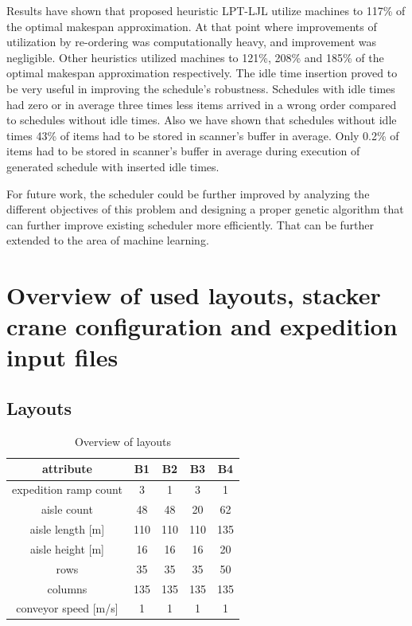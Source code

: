 \documentclass{ctuthesis}
\begin{document}
Results have shown that proposed heuristic LPT-LJL utilize machines to 117\% of the optimal makespan approximation. At that point where improvements of utilization by re-ordering was computationally heavy, and improvement was negligible. Other heuristics utilized machines to 121\%, 208\% and 185\% of the optimal makespan approximation respectively. The idle time insertion proved to be very useful in improving the schedule's robustness. Schedules with idle times had zero or in average three times less items arrived in a wrong order compared to schedules without idle times. Also we have shown that schedules without idle times 43\% of items had to be stored in scanner's buffer in average. Only 0.2\% of items had to be stored in scanner's buffer in average during execution of generated schedule with inserted idle times.

For future work, the scheduler could be further improved by analyzing the different objectives of this problem and designing a proper genetic algorithm that can further improve existing scheduler more efficiently. That can be further extended to the area of machine learning.






\appendix

\chapter{Overview of used layouts, stacker crane configuration and expedition input files}

\section{Layouts}

\begin{table}[H]
\begin{tabular}{ |c|| c | c | c | c |} 
\hline
attribute & B1 & B2 & B3 & B4\\ 
\hline
expedition ramp count & 3 & 1 & 3 & 1 \\
\hline
aisle count & 48 & 48 & 20 & 62\\
\hline
aisle length [m] &  110 & 110 & 110 & 135\\
\hline
aisle height [m] & 16 & 16 & 16 & 20\\
\hline
rows & 35 & 35 & 35 & 50\\ 
\hline
columns & 135 & 135 & 135 & 135\\ 
\hline
conveyor speed [m/s] & 1 & 1 & 1 & 1\\ 
\hline
\end{tabular}
\caption{Overview of layouts} \label{tab:layoutoverview}
\end{table}
\end{document}

